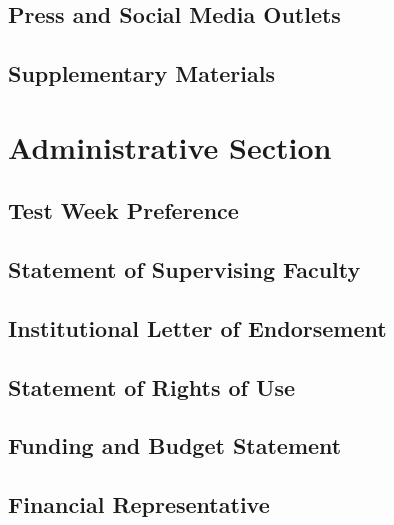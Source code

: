 \documentclass{article}
\begin{document}
\subsection{Press and Social Media Outlets}
\subsection{Supplementary Materials}


\section{Administrative Section}
\subsection{Test Week Preference}
\subsection{Statement of Supervising Faculty}
\subsection{Institutional Letter of Endorsement}
\subsection{Statement of Rights of Use}
\subsection{Funding and Budget Statement}
\subsection{Financial Representative}
\end{document}
